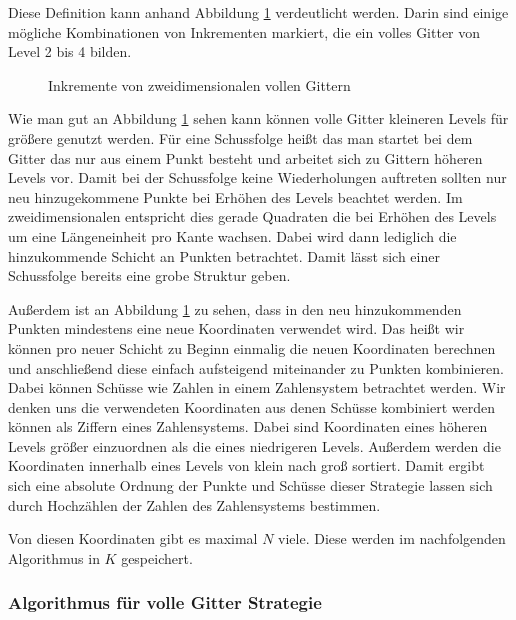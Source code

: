 \documentclass[a4paper,12pt]{llncs}
\numberwithin{equation}{section}
\begin{document}
Diese Definition kann anhand Abbildung \ref{fig:gitter02} verdeutlicht werden. Darin sind einige mögliche Kombinationen von Inkrementen markiert, die ein volles Gitter von Level 2 bis 4 bilden.

\begin{figure}
	\caption{Inkremente von zweidimensionalen vollen Gittern}
	\label{fig:gitter02}
\end{figure}

Wie man gut an Abbildung \ref{fig:gitter02} sehen kann können volle Gitter kleineren Levels für größere genutzt werden. Für eine Schussfolge heißt das man startet bei dem Gitter das nur aus einem Punkt besteht und arbeitet sich zu Gittern höheren Levels vor. Damit bei der Schussfolge keine Wiederholungen auftreten sollten nur neu hinzugekommene Punkte bei Erhöhen des Levels beachtet werden. Im zweidimensionalen entspricht dies gerade Quadraten die bei Erhöhen des Levels um eine Längeneinheit pro Kante wachsen. Dabei wird dann lediglich die hinzukommende Schicht an Punkten betrachtet. Damit lässt sich einer Schussfolge bereits eine grobe Struktur geben. 

Außerdem ist an Abbildung \ref{fig:gitter02} zu sehen, dass in den neu hinzukommenden Punkten mindestens eine neue Koordinaten verwendet wird. Das heißt wir können pro neuer Schicht zu Beginn einmalig die neuen Koordinaten berechnen und anschließend diese einfach aufsteigend miteinander zu Punkten kombinieren. Dabei können Schüsse wie Zahlen in einem Zahlensystem betrachtet werden. Wir denken uns die verwendeten Koordinaten aus denen Schüsse kombiniert werden können als Ziffern eines Zahlensystems. Dabei sind Koordinaten eines höheren Levels größer einzuordnen als die eines niedrigeren Levels. Außerdem werden die Koordinaten innerhalb eines Levels von klein nach groß sortiert. Damit ergibt sich eine absolute Ordnung der Punkte und Schüsse dieser Strategie lassen sich durch Hochzählen der Zahlen des Zahlensystems bestimmen.

Von diesen Koordinaten gibt es maximal $N$ viele. Diese werden im nachfolgenden Algorithmus in $K$ gespeichert.

\subsubsection{Algorithmus für volle Gitter Strategie}
\end{document}
